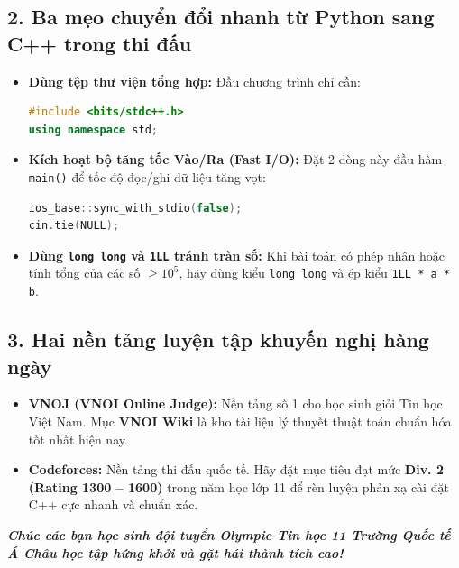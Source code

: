 \documentclass[11pt,a4paper]{article}
\begin{document}
\subsection*{\color{AsianBlue}\normalsize 2. Ba mẹo chuyển đổi nhanh từ Python sang C++ trong thi đấu}
\begin{tcolorbox}[colback=AsianLightBlue,colframe=AsianBlue,arc=2mm,title=\textbf{BÍ KÍP BỎ TÚI KHI LẬP TRÌNH C++ THI ĐẤU}]
\begin{itemize}
    \setlength{\itemsep}{3pt}
    \item \textbf{Dùng tệp thư viện tổng hợp:} Đầu chương trình chỉ cần:
\begin{lstlisting}[style=codeC,language=C++]
#include <bits/stdc++.h>
using namespace std;
\end{lstlisting}
    \item \textbf{Kích hoạt bộ tăng tốc Vào/Ra (Fast I/O):} Đặt 2 dòng này đầu hàm \texttt{main()} để tốc độ đọc/ghi dữ liệu tăng vọt:
\begin{lstlisting}[style=codeC,language=C++]
ios_base::sync_with_stdio(false);
cin.tie(NULL);
\end{lstlisting}
    \item \textbf{Dùng \texttt{long long} và \texttt{1LL} tránh tràn số:} Khi bài toán có phép nhân hoặc tính tổng của các số $\ge 10^5$, hãy dùng kiểu \texttt{long long} và ép kiểu \texttt{1LL * a * b}.
\end{itemize}
\end{tcolorbox}

\subsection*{\color{AsianBlue}\normalsize 3. Hai nền tảng luyện tập khuyến nghị hàng ngày}
\begin{itemize}
    \setlength{\itemsep}{2pt}
    \item \textbf{VNOJ (VNOI Online Judge):} Nền tảng số 1 cho học sinh giỏi Tin học Việt Nam. Mục \textbf{VNOI Wiki} là kho tài liệu lý thuyết thuật toán chuẩn hóa tốt nhất hiện nay.
    \item \textbf{Codeforces:} Nền tảng thi đấu quốc tế. Hãy đặt mục tiêu đạt mức \textbf{Div. 2 (Rating 1300 -- 1600)} trong năm học lớp 11 để rèn luyện phản xạ cài đặt C++ cực nhanh và chuẩn xác.
\end{itemize}

\vspace{0.3cm}
\begin{center}
    \textit{\color{AsianDarkBlue}\textbf{Chúc các bạn học sinh đội tuyển Olympic Tin học 11 Trường Quốc tế Á Châu học tập hứng khởi và gặt hái thành tích cao!}}
\end{center}
\end{document}
